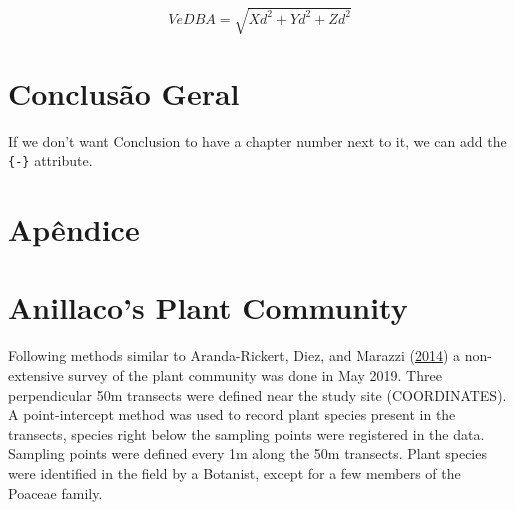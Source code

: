 \documentclass[msc,numbers,hidelinks]{coppe}
\begin{document}
  \[ VeDBA = \sqrt{Xd^2 + Yd^2 + Zd^2} \]

  \hypertarget{conclusuxe3o-geral}{%
  \chapter*{Conclusão Geral}\label{conclusuxe3o-geral}}

  If we don't want Conclusion to have a chapter number next to it, we can add the \texttt{\{-\}} attribute.

  \appendix

  \hypertarget{apuxeandice}{%
  \chapter*{Apêndice}\label{apuxeandice}}

  \hypertarget{anillacos-plant-community}{%
  \chapter{Anillaco's Plant Community}\label{anillacos-plant-community}}

  Following methods similar to Aranda-Rickert, Diez, and Marazzi (\protect\hyperlink{ref-aranda-rickertExtrafloralNectarFuels2014}{2014}) a non-extensive survey of the plant community was done in May 2019. Three perpendicular 50m transects were defined near the study site (COORDINATES). A point-intercept method was used to record plant species present in the transects, species right below the sampling points were registered in the data. Sampling points were defined every 1m along the 50m transects. Plant species were identified in the field by a Botanist, except for a few members of the Poaceae family.
\end{document}
